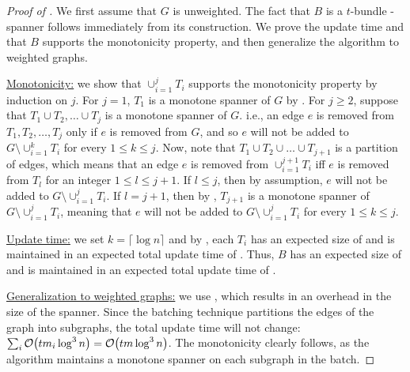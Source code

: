 \begin{proof}[Proof of ]
We first assume that \( G \) is unweighted.
The fact that \( B \) is a \( t \)-bundle -spanner follows immediately from its construction.
We prove the update time and that \( B \) supports the monotonicity property, and then generalize the algorithm to weighted graphs.

\underline{Monotonicity:}
we show that \( \cup_{i = 1} ^j T_i \) supports the monotonicity property by induction on \( j \).
For \( j = 1 \), \( T_1 \) is a monotone spanner of \( G \) by .
For \( j \geq 2 \), suppose that \( T_1 \cup T_2, \dots \cup T_j \) is a monotone spanner of \( G \).
i.e., an edge \( e \) is removed from \( T_1, T_2, \dots, T_j \) only if \( e \) is removed from \( G \), and so \( e \) will not be added to \( G \setminus \cup_{i = 1} ^{k} T_i \) for every \( 1 \leq k \leq j \).
Now, note that \( T_1 \cup T_2 \cup \dots \cup T_{j + 1} \) is a partition of edges, which means that an edge \( e \) is removed from \( \cup_{i = 1} ^{j+1} T_i \) iff \( e \) is removed from \( T_l \) for an integer \( 1 \leq l \leq j + 1 \).
If \( l \leq j \), then by assumption, \( e \) will not be added to \( G \setminus \cup _{i = 1} ^j T_i \).
If \( l = j + 1 \), then by , \( T_{j + 1} \) is a monotone spanner of \( G \setminus \cup_{i = 1} ^{j} T_i \), meaning that \( e \) will not be added to \( G \setminus \cup _{i = 1} ^j T_i \) for every \( 1 \leq k \leq j \).

\underline{Update time:}
we set \( k = \lceil \log n \rceil \) and by , each \( T_i \) has an expected size of  and is maintained in an expected total update time of .
Thus, \( B \) has an expected size of  and is maintained in an expected total update time of .

\underline{Generalization to weighted graphs:}
we use , which results in an  overhead in the size of the spanner.
Since the batching technique partitions the edges of the graph into subgraphs, the total update time will not change: \( \sum _i \atmost{t m_i \log ^3 n} = \atmost{t m \log ^3 n} \).
The monotonicity clearly follows, as the algorithm maintains a monotone spanner on each subgraph in the batch. 
\end{proof}









